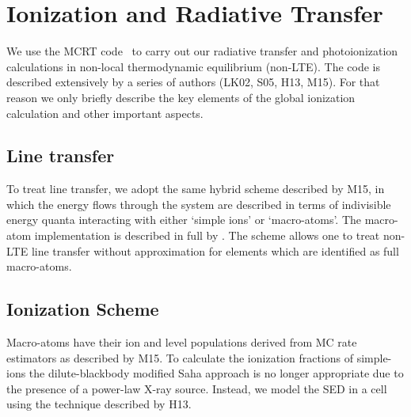 \documentclass[useAMS,usenatbib]{mn2e_x}
\begin{document}










\section{Ionization and Radiative Transfer}

We use the MCRT code \py\ to carry out our radiative transfer and photoionization
calculations in non-local thermodynamic equilibrium (non-LTE). 
The code is described extensively by a series of authors (LK02, S05, H13, M15).
For that reason we only briefly describe the key elements of the global 
ionization calculation and other important aspects.

\subsection{Line transfer}

To treat line transfer, we adopt the same hybrid scheme 
described by M15, 
in which the energy flows
through the system are described in terms of indivisible
energy quanta interacting with either `simple ions'
or `macro-atoms'. The macro-atom implementation 
is described in full by \cite{lucy2002, lucy2003}.
The scheme allows one to treat non-LTE line transfer without
approximation for elements which are identified as 
full macro-atoms.


\subsection{Ionization Scheme}

Macro-atoms have their ion and level populations derived from
MC rate estimators as described by M15. To calculate the ionization fractions
of simple-ions the dilute-blackbody modified Saha approach \citep{ML93} is no longer appropriate
due to the presence of a power-law X-ray source. Instead, we model
the SED in a cell using the technique described by H13.
\end{document}
